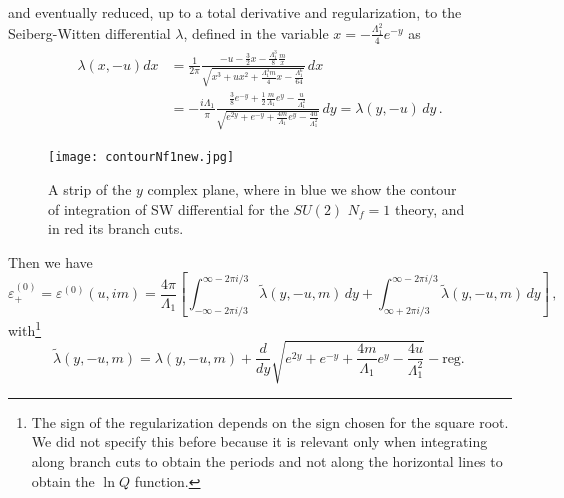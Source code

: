 \documentclass[11pt,a4paper]{elsarticle}
\newcommand{\be}{\begin{equation}}
\newcommand{\ee}{\end{equation}}
\numberwithin{figure}{section}
\numberwithin{table}{section}
\begin{document}
     and eventually reduced, up to a total derivative and regularization, to the Seiberg-Witten differential $\lambda$, defined in the variable $x=- \frac{\Lambda_1^2}{4}e^{-y}$ as~\cite{BilalFerrari-massive:1997}
\begin{align}
 \begin{split}
  \lambda(x,-u) d x&= \frac{1}{2\pi  } \frac{-u-\frac{3}{2}x-\frac{\Lambda_1^3}{8}\frac{m}{x}}{\sqrt{x^3+u x^2+\frac{\Lambda_1^3 m}{4}x - \frac{\Lambda_1^6}{64}}} \,d x \\
  &=- \frac{i \Lambda_1}{\pi } \frac{\frac{3}{8} e^{-y}+\frac{1}{2}\frac{m}{\Lambda_1} e^y-\frac{u}{\Lambda_1^2}}{\sqrt{e^{2 y}+e^{-y}+\frac{4m}{\Lambda_1}e^y-\frac{4 u}{\Lambda_1^2}}}\, d y = \lambda(y,-u) \, d y\,.
  \end{split}
\end{align}
\begin{figure}[t]\label{figY1cycSW}
\centering
\texttt{[image: contourNf1new.jpg]}%
\caption{A strip of the $y$ complex plane, where in blue we show the contour of integration of SW differential for the $SU(2)$ $N_f=1$ theory, and %
in red its branch cuts.}
\end{figure}
 Then we have
\be \label{proofNf1eps0lambda}
\varepsilon^{(0)}_+ =\varepsilon^{(0)}(u,i m)= \frac{4 \pi}{\Lambda_1}\left[ \int_{-\infty-2 \pi i/3}^{\infty- 2 \pi i/3} \tilde{ \lambda}(y,-u,m) \, dy +\int_{\infty+2 \pi i/3}^{\infty- 2 \pi i/3} \tilde{ \lambda}(y,-u,m) \, dy \right]\,,
\ee
with\footnote{The sign of the regularization depends on the sign chosen for the square root. We did not specify this before because it is relevant only when integrating along branch cuts to obtain the periods and not along the horizontal lines to obtain the $\ln Q$ function.}
     \be
    \tilde{ \lambda} (y,-u,m)= \lambda(y,-u,m) +\frac{d}{d y}\sqrt{e^{2y}+e^{-y}+\frac{4m}{\Lambda_1} e^y-\frac{4u}{\Lambda_1^2}}- \mathrm{reg.} \,%
     \ee
\end{document}
